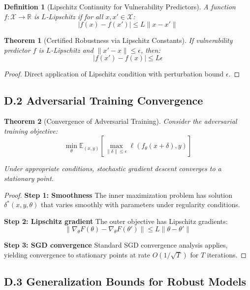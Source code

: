 \documentclass[journal]{IEEEtran}
\newtheorem{theorem}{Theorem}
\newtheorem{definition}{Definition}
\begin{document}
\begin{definition}[Lipschitz Continuity for Vulnerability Predictors]
A function $f: \mathcal{X} \rightarrow \mathbb{R}$ is $L$-Lipschitz if for all $x, x' \in \mathcal{X}$:
$$|f(x) - f(x')| \leq L \|x - x'\|$$
\end{definition}

\begin{theorem}[Certified Robustness via Lipschitz Constants]
If vulnerability predictor $f$ is $L$-Lipschitz and $\|x' - x\| \leq \epsilon$, then:
$$|f(x') - f(x)| \leq L \epsilon$$
\end{theorem}

\begin{proof}
Direct application of Lipschitz condition with perturbation bound $\epsilon$.
\end{proof}

\subsection{D.2 Adversarial Training Convergence}

\begin{theorem}[Convergence of Adversarial Training]
Consider the adversarial training objective:
$$\min_\theta \mathbb{E}_{(x,y)} \left[ \max_{\|\delta\| \leq \epsilon} \ell(f_\theta(x + \delta), y) \right]$$

Under appropriate conditions, stochastic gradient descent converges to a stationary point.
\end{theorem}

\begin{proof}
\textbf{Step 1: Smoothness}
The inner maximization problem has solution $\delta^*(x, y, \theta)$ that varies smoothly with parameters under regularity conditions.

\textbf{Step 2: Lipschitz gradient}
The outer objective has Lipschitz gradients:
$$\|\nabla_\theta F(\theta) - \nabla_\theta F(\theta')\| \leq L \|\theta - \theta'\|$$

\textbf{Step 3: SGD convergence}
Standard SGD convergence analysis applies, yielding convergence to stationary points at rate $O(1/\sqrt{T})$ for $T$ iterations.
\end{proof}

\subsection{D.3 Generalization Bounds for Robust Models}
\end{document}
